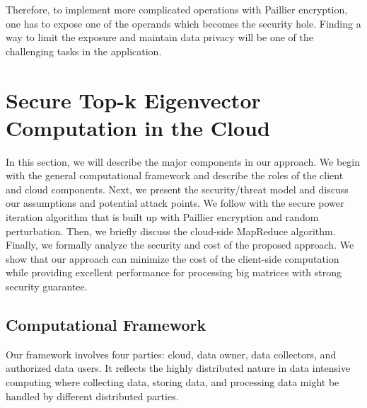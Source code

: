 \documentclass[10pt, conference, compsocconf]{IEEEtran}
\begin{document}
Therefore, to implement more complicated operations with Paillier encryption, one has to expose one of the operands which becomes the security hole. Finding a way to limit the exposure and maintain data privacy will be one of the challenging tasks in the application. 





\section{Secure Top-k Eigenvector Computation in the Cloud}\label{sec:approach}
In this section, we will describe the major components in our approach. We begin with the general computational framework and describe the roles of the client and cloud components. Next, we present the security/threat model and discuss our assumptions and potential attack points. We follow with the secure power iteration algorithm that is built up with Paillier encryption and random perturbation. Then, we briefly discuss the cloud-side MapReduce algorithm. Finally, we formally analyze the security and cost of the proposed approach. We show that our approach can minimize the cost of the client-side computation while providing excellent performance for processing big matrices with strong security guarantee.

\subsection{Computational Framework}

Our framework involves four parties: cloud, data owner, data collectors, and authorized data users. It reflects the highly distributed nature in data intensive computing where collecting data, storing data, and processing data might be handled by different distributed parties. 
\end{document}
